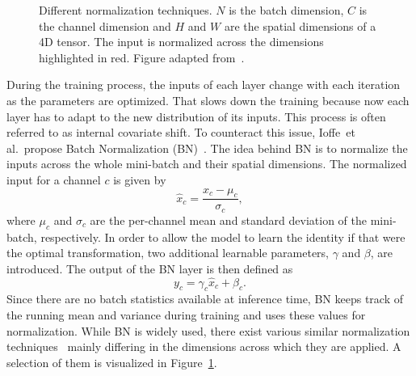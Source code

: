 \begin{figure}
    \hfill

    \caption{
        Different normalization techniques. $N$ is the batch dimension, $C$ is the channel dimension and $H$ and $W$ are
        the spatial dimensions of a 4D tensor. The input is normalized across the dimensions highlighted in red.
        Figure adapted from~\cite{GroupNorm}.
    }\label{fig:normalization}
\end{figure}

During the training process, the inputs of each layer change with each iteration as the parameters are optimized.
That slows down the training because now each layer has to adapt to the new distribution of its inputs. This process is often referred to as internal covariate shift.
To counteract this issue, Ioffe~et al.\ propose Batch Normalization (BN)~\cite{BatchNorm}.
The idea behind BN is to normalize the inputs across the whole mini-batch and their spatial dimensions.
The normalized input for a channel $c$ is given by
\begin{equation}
    \hat{x}_c = \frac{x_c - \mu_c}{\sigma_c},
\end{equation} 
where $\mu_c$ and $\sigma_c$ are the per-channel mean and standard deviation of the mini-batch, respectively.  
In order to allow the model to learn the identity if that were the optimal transformation, two additional learnable parameters, $\gamma$ and $\beta$, are introduced. The output of the BN layer is then defined as
\begin{equation}
    y_c = \gamma_c\hat{x}_c + \beta_c.
\end{equation}
Since there are no batch statistics available at inference time, BN keeps track of the running mean and variance during training and uses these values for normalization.
While BN is widely used, there exist various similar normalization techniques~\cite{LayerNorm, InstanceNorm, GroupNorm} mainly differing in the dimensions across which they are applied.
A selection of them is visualized in Figure~\ref{fig:normalization}.


